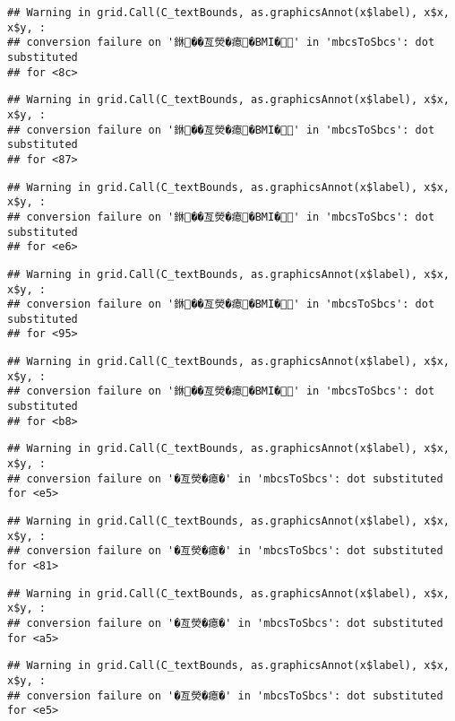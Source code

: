 \documentclass[
]{article}
\begin{document}
\begin{verbatim}
## Warning in grid.Call(C_textBounds, as.graphicsAnnot(x$label), x$x, x$y, :
## conversion failure on '銝��亙熒�瘜�BMI�' in 'mbcsToSbcs': dot substituted
## for <8c>
\end{verbatim}

\begin{verbatim}
## Warning in grid.Call(C_textBounds, as.graphicsAnnot(x$label), x$x, x$y, :
## conversion failure on '銝��亙熒�瘜�BMI�' in 'mbcsToSbcs': dot substituted
## for <87>
\end{verbatim}

\begin{verbatim}
## Warning in grid.Call(C_textBounds, as.graphicsAnnot(x$label), x$x, x$y, :
## conversion failure on '銝��亙熒�瘜�BMI�' in 'mbcsToSbcs': dot substituted
## for <e6>
\end{verbatim}

\begin{verbatim}
## Warning in grid.Call(C_textBounds, as.graphicsAnnot(x$label), x$x, x$y, :
## conversion failure on '銝��亙熒�瘜�BMI�' in 'mbcsToSbcs': dot substituted
## for <95>
\end{verbatim}

\begin{verbatim}
## Warning in grid.Call(C_textBounds, as.graphicsAnnot(x$label), x$x, x$y, :
## conversion failure on '銝��亙熒�瘜�BMI�' in 'mbcsToSbcs': dot substituted
## for <b8>
\end{verbatim}

\begin{verbatim}
## Warning in grid.Call(C_textBounds, as.graphicsAnnot(x$label), x$x, x$y, :
## conversion failure on '�亙熒�瘜�' in 'mbcsToSbcs': dot substituted for <e5>
\end{verbatim}

\begin{verbatim}
## Warning in grid.Call(C_textBounds, as.graphicsAnnot(x$label), x$x, x$y, :
## conversion failure on '�亙熒�瘜�' in 'mbcsToSbcs': dot substituted for <81>
\end{verbatim}

\begin{verbatim}
## Warning in grid.Call(C_textBounds, as.graphicsAnnot(x$label), x$x, x$y, :
## conversion failure on '�亙熒�瘜�' in 'mbcsToSbcs': dot substituted for <a5>
\end{verbatim}

\begin{verbatim}
## Warning in grid.Call(C_textBounds, as.graphicsAnnot(x$label), x$x, x$y, :
## conversion failure on '�亙熒�瘜�' in 'mbcsToSbcs': dot substituted for <e5>
\end{verbatim}
\end{document}
